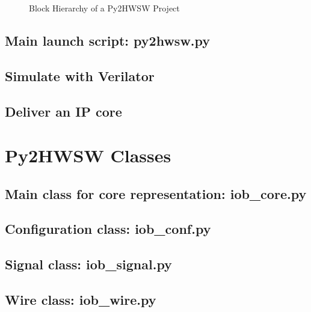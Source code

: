 \documentclass{ug}
\begin{document}
\begin{figure}[H]
  \vspace{-0.7cm}
  \caption{Block Hierarchy of a Py2HWSW Project}
  \label{fig:py2_superblocks_subblocks}
\end{figure}

\subsection{Main launch script: py2hwsw.py}
\label{sec:launch_script}


\subsection{Simulate with Verilator}
\label{sec:verilator}


\subsection{Deliver an IP core}
\label{sec:deliver}

%
%
\section{Py2HWSW Classes}
\label{sec:py_classes}

\subsection{Main class for core representation: iob\_core.py}
\label{sec:iob_core}


\subsection{Configuration class: iob\_conf.py}
\label{sec:iob_conf}


\subsection{Signal class: iob\_signal.py}
\label{sec:iob_signal}


\subsection{Wire class: iob\_wire.py}
\label{sec:iob_wire}

\end{document}
